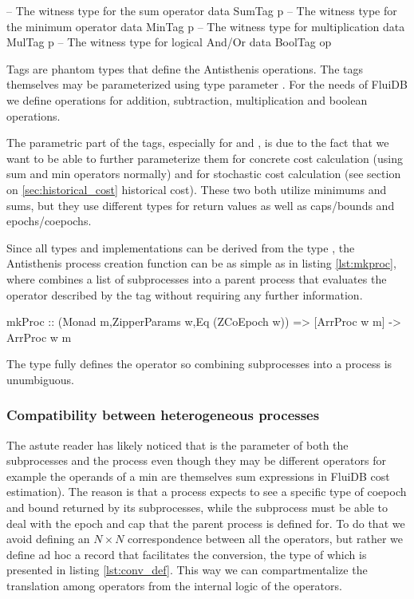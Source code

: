 \begin{code}
\begin{haskellcode}
-- The witness type for the sum operator
data SumTag p
-- The witness type for the minimum operator
data MinTag p
-- The witness type for multiplication
data MulTag p
-- The witness type for logical And/Or
data BoolTag op
\end{haskellcode}
  \caption{\label{lst:tag_types}Tags are phantom types that define the
    Antisthenis operations. The tags themselves may be parameterized
    using type parameter . For the needs of FluiDB we define
    operations for addition, subtraction, multiplication and boolean
    operations.}
\end{code}

The parametric part of the tags, especially for  and
, is due to the fact that we want to be able to further
parameterize them for concrete cost calculation (using sum and min
operators normally) and for stochastic cost calculation (see section
on \ref{sec:historical_cost} historical cost). These two both utilize
minimums and sums, but they use different types for return values as
well as caps/bounds and epochs/coepochs.

Since all types and implementations can be derived from the
 type , the Antisthenis process creation
function can be as simple as in listing \ref{lst:mkproc}, where
 combines a list of subprocesses into a parent process
that evaluates the operator described by the tag  without
requiring any further information.

\begin{code}
\begin{haskellcode}
mkProc
  :: (Monad m,ZipperParams w,Eq (ZCoEpoch w)) => [ArrProc w m] -> ArrProc w m
\end{haskellcode}
  \caption{\label{lst:mkproc}The type  fully defines the
    operator so combining subprocesses into a process is unumbiguous.}
\end{code}

\subsubsection{Compatibility  between heterogeneous processes}

The astute reader has likely noticed that  is the parameter of
both the subprocesses and the process even though they may be
different operators for example the operands of a min are themselves
sum expressions in FluiDB cost estimation). The reason is that a
process expects to see a specific type of coepoch and bound returned
by its subprocesses, while the subprocess must be able to deal with
the epoch and cap that the parent process is defined for. To do that
we avoid defining an \(N \times N\) correspondence between all the
operators, but rather we define ad hoc a record that facilitates the
conversion, the type of which is presented in listing
\ref{lst:conv_def}. This way we can compartmentalize the translation
among operators from the internal logic of the operators.


